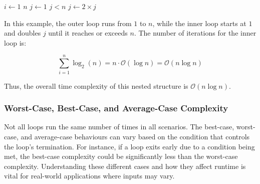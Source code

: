 \begin{example}

    \begin{codebox}
        \li \For $i \gets 1$ \To $n$ \Do
        \li     $j \gets 1$
        \li     \While $j < n$ \Do
        \li         {}
        \li         $j \gets 2 \times j$
                \End
            \End
    \end{codebox}

    In this example, the outer loop runs from $1$ to $n$, while the inner loop starts at $1$ and doubles $j$ until it reaches or exceeds $n$. The number of iterations for the inner loop is:

    \[
    \sum_{i=1}^{n} \log_2(n) = n \cdot \mathcal{O}(\log n) = \mathcal{O}(n \log n)
    \]

    Thus, the overall time complexity of this nested structure is $\mathcal{O}(n \log n)$.
\end{example}



\subsubsection*{Worst-Case, Best-Case, and Average-Case Complexity}
Not all loops run the same number of times in all scenarios. The best-case, worst-case, and average-case behaviours can vary based on the condition that controls the loop's termination. For instance, if a loop exits early due to a condition being met, the best-case complexity could be significantly less than the worst-case complexity. Understanding these different cases and how they affect runtime is vital for real-world applications where inputs may vary.

